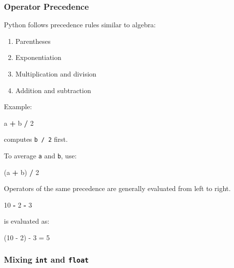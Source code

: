 \documentclass[
]{article}
\newenvironment{Shaded}{\begin{snugshade}}{\end{snugshade}}
\newcommand{\DecValTok}[1]{\textcolor[rgb]{0.00,0.00,0.81}{#1}}
\newcommand{\NormalTok}[1]{#1}
\newcommand{\OperatorTok}[1]{\textcolor[rgb]{0.81,0.36,0.00}{\textbf{#1}}}
\providecommand{\tightlist}{%
  \setlength{\itemsep}{0pt}\setlength{\parskip}{0pt}}
\begin{document}
\subsubsection{Operator Precedence}\label{operator-precedence}

Python follows precedence rules similar to algebra:

\begin{enumerate}
\def\labelenumi{\arabic{enumi}.}
\tightlist
\item
  Parentheses
\item
  Exponentiation
\item
  Multiplication and division
\item
  Addition and subtraction
\end{enumerate}

Example:

\begin{Shaded}
\begin{Highlighting}[]
\NormalTok{a }\OperatorTok{+}\NormalTok{ b }\OperatorTok{/} \DecValTok{2}
\end{Highlighting}
\end{Shaded}

computes \texttt{b\ /\ 2} first.

To average \texttt{a} and \texttt{b}, use:

\begin{Shaded}
\begin{Highlighting}[]
\NormalTok{(a }\OperatorTok{+}\NormalTok{ b) }\OperatorTok{/} \DecValTok{2}
\end{Highlighting}
\end{Shaded}

Operators of the same precedence are generally evaluated from left to
right.

\begin{Shaded}
\begin{Highlighting}[]
\DecValTok{10} \OperatorTok{{-}} \DecValTok{2} \OperatorTok{{-}} \DecValTok{3}
\end{Highlighting}
\end{Shaded}

is evaluated as:

\begin{Shaded}
\begin{Highlighting}[]
\NormalTok{(10 {-} 2) {-} 3 = 5}
\end{Highlighting}
\end{Shaded}

\subsubsection{\texorpdfstring{Mixing \texttt{int} and
\texttt{float}}{Mixing int and float}}\label{mixing-int-and-float}
\end{document}

